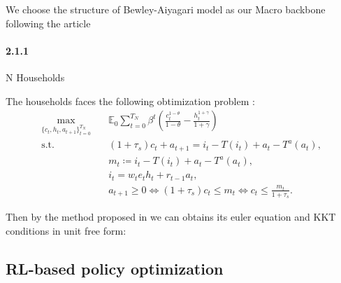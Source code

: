 \documentclass[11pt]{article}
\begin{document}
We choose the structure of Bewley-Aiyagari model as our Macro backbone following the article \cite{mi2023taxai}

\paragraph{2.1.1} N Households

The households faces the following obtimization problem :
\begin{equation}
\begin{aligned}
\max_{\{c_t,h_t,a_{t+1}\}_{t=0}^{T_N}} \quad 
& \mathbb{E}_0 \sum_{t=0}^{T_N} \beta^t 
\left( \frac{c_t^{1-\theta}}{1-\theta} - \frac{h_t^{1+\gamma}}{1+\gamma} \right) \\[4pt]
\text{s.t.}\quad 
& (1+\tau_s)c_t + a_{t+1} = i_t - T(i_t) + a_t - T^{a}(a_t), \\
& m_t \coloneqq i_t - T(i_t) + a_t - T^{a}(a_t),\\
& i_t = w_t e_t h_t + r_{t-1} a_t,\\
& a_{t+1} \ge 0 \iff (1+\tau_s)c_t \le m_t \iff c_t \le \frac{m_t}{1+\tau_s}.
\end{aligned}
\tag{1}
\end{equation}

Then by the method proposed in \cite{maliar2021deep} we can obtains its euler equation and KKT conditions in unit free form:



\subsection{RL-based policy optimization}


\appendix
\end{document}
